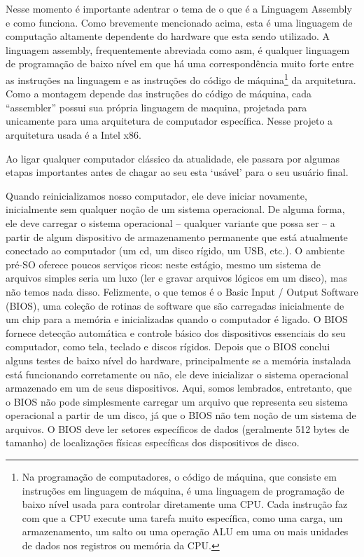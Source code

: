 Nesse momento é importante adentrar o tema de o que é a Linguagem Assembly e como funciona. Como brevemente mencionado acima, esta é uma linguagem de computação altamente dependente do hardware que esta sendo utilizado. A linguagem assembly, frequentemente abreviada como asm, é qualquer linguagem de programação de baixo nível em que há uma correspondência muito forte entre as instruções na linguagem e as instruções do código de máquina\footnote{Na programação de computadores, o código de máquina, que consiste em instruções em linguagem de máquina, é uma linguagem de programação de baixo nível usada para controlar diretamente uma CPU. Cada instrução faz com que a CPU execute uma tarefa muito específica, como uma carga, um armazenamento, um salto ou uma operação ALU em uma ou mais unidades de dados nos registros ou memória da CPU.} da arquitetura. Como a montagem depende das instruções do código de máquina, cada ``assembler'' possui sua própria linguagem de maquina, projetada para unicamente para uma arquitetura de computador específica. Nesse projeto a arquitetura usada é a Intel x86.

Ao ligar qualquer computador clássico da atualidade, ele passara por algumas etapas importantes antes de chagar ao seu esta `usável' para o seu usuário final. 

Quando reinicializamos nosso computador, ele deve iniciar novamente, inicialmente sem qualquer noção de um sistema operacional. De alguma forma, ele deve carregar o sistema operacional – qualquer variante que possa ser – a partir de algum dispositivo de armazenamento permanente que está atualmente conectado ao computador (um cd, um disco rígido, um USB, etc.). O ambiente pré-SO oferece poucos serviços ricos: neste estágio, mesmo um sistema de arquivos simples seria um luxo (ler e gravar arquivos lógicos em um disco), mas não temos nada disso. Felizmente, o que temos é o Basic Input / Output Software (BIOS), uma coleção de rotinas de software que são carregadas inicialmente de um chip para a memória e inicializadas quando o computador é ligado. O BIOS fornece detecção automática e controle básico dos dispositivos essenciais do seu computador, como tela, teclado e discos rígidos. Depois que o BIOS conclui alguns testes de baixo nível do hardware, principalmente se a memória instalada está funcionando corretamente ou não, ele deve inicializar o sistema operacional armazenado em um de seus dispositivos. Aqui, somos lembrados, entretanto, que o BIOS não pode simplesmente carregar um arquivo que representa seu sistema operacional a partir de um disco, já que o BIOS não tem noção de um sistema de arquivos. O BIOS deve ler setores específicos de dados (geralmente 512 bytes de tamanho) de localizações físicas específicas dos dispositivos de disco.

